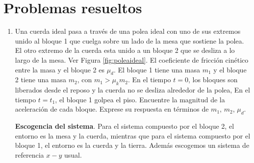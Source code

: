 \section{Problemas resueltos}

\begin{enumerate}
\item Una cuerda ideal pasa a través de una polea ideal con uno de sus
  extremos unido al bloque 1 que cuelga sobre un lado de la mesa que
  sostiene la polea. El otro extremo de la cuerda esta unido a un
  bloque 2 que se desliza a lo largo de la mesa. Ver Figura
  \ref{fig:poleaideal}. El coeficiente de fricción cinético entre la
  masa y el bloque 2 es $\mu_d$. El bloque 1 tiene una masa $m_1$ y el
  bloque 2 tiene una masa $m_2$, con $m_1>\mu_k m_2$. En el tiempo
  $t=0$, los bloques son liberados desde el reposo y la cuerda no se
  desliza alrededor de la polea, En el tiempo $t=t_1$, el bloque 1
  golpea el piso. Encuentre la magnitud de la aceleración de cada
  bloque. Exprese su respuesta en términos de $m_1$, $m_2$, $\mu_d$. 

  \textbf{Escogencia del sistema}. Para el sistema compuesto por el bloque 2, el entorno es la mesa y la cuerda, mientras que para el sistema compuesto por el bloque 1, el entorno es la cuerda y la tierra. Además escogemos un sistema de referencia $x-y$ usual. 


\end{enumerate}
